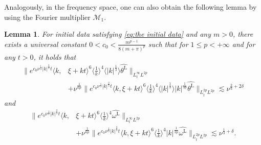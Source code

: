 \documentclass[reqno, 12pt]{amsart} %
\theoremstyle{plain} %
\newtheorem{Lem}[Thm]{Lemma}     %
\theoremstyle{definition}
\theoremstyle{remark}
\numberwithin{equation}{section} %
\begin{document}
	
	Analogously, in the frequency space, one can also obtain the following lemma by using the Fourier multiplier $\mathcal{M}_1$.
	\begin{Lem} \label{lem:linear}
		For initial data satisfying \eqref{eq:the initial data} and any $m>0$, there exists a universal constant $0< c_0 < \frac{m^{p-1}}{8(m+\pi)^p}$ such that for $ 1\leq p< +\infty$ and for any $t>0$, it holds that
		\begin{equation*}\begin{aligned} 
				\|  e^{c_0 \nu^\frac13 |k|^\frac23 t} \langle k, & \xi + kt\rangle^6 \langle \frac{1}{k}\rangle^4 \langle |k|^\frac13 \rangle \widehat{\theta^{\mathrm{L}}} \|_{L_t^\infty L^{2p}} \\
				&+ \nu^\frac{1}{6p} \| e^{ c_0 \nu^\frac13 |k|^\frac23 t}    \langle k, \xi + kt\rangle^6 \langle \frac{1}{k}\rangle^4 \langle |k|^\frac13 \rangle |k|^\frac{1}{3p} \widehat{\theta^{\mathrm{L}}} \|_{L_t^{2p} L^{2p}} \lesssim \nu^{\frac{2}{3} + 2\delta} 
		\end{aligned}\end{equation*}
		and
		\begin{equation*}\begin{aligned} 
				\|  e^{c_0 \nu^\frac13 |k|^\frac23 t} \langle k, &\xi + kt\rangle^6 \langle \frac{1}{k}\rangle^4 \widehat{\omega^{\mathrm{L}}} \|_{L_t^\infty L^{2p}} \\
				&+ \nu^\frac{1}{6p} \| e^{ c_0 \nu^\frac13 |k|^\frac23 t}    \langle k, \xi + kt\rangle^6 \langle \frac{1}{k}\rangle^4  |k|^\frac{1}{3p} \widehat{\omega^{\mathrm{L}}} \|_{L_t^{2p} L^{2p}} \lesssim \nu^{\frac{1}{3} +\delta} .
		\end{aligned}\end{equation*}
	\end{Lem}
\end{document}

